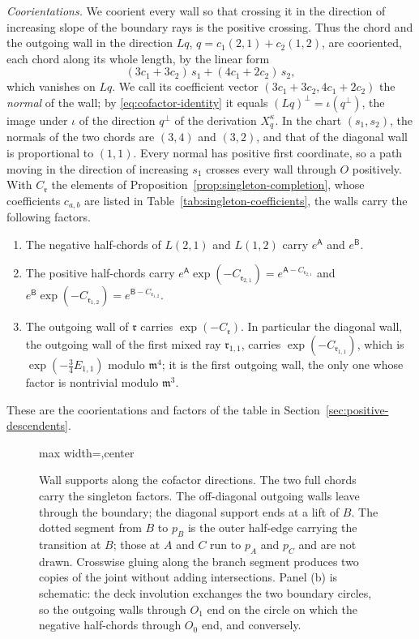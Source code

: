 \emph{Coorientations.}  We coorient every wall so that crossing it in the
direction of increasing slope of the boundary rays is the positive crossing.  Thus the
chord and the outgoing wall in the direction $Lq$,
$q=c_1(2,1)+c_2(1,2)$, are cooriented, each chord along its whole length,
by the linear form
\[
 (3c_1+3c_2)\,s_1+(4c_1+2c_2)\,s_2,
\]
which vanishes on $Lq$.  We call its coefficient vector
$(3c_1+3c_2,4c_1+2c_2)$ the \emph{normal} of the wall; by
\eqref{eq:cofactor-identity} it equals $(Lq)^\perp=\iota(q^\perp)$, the
image under $\iota$ of the direction $q^\perp$ of the derivation
$X^\kappa_q$.  In the chart $(s_1,s_2)$, the normals of the two chords are
$(3,4)$ and $(3,2)$, and that of the diagonal wall is proportional to
$(1,1)$.  Every normal has positive first coordinate, so a path moving in
the direction of increasing $s_1$ crosses every wall through $O$ positively.
With $C_{\mathfrak r}$ the elements of
Proposition~\ref{prop:singleton-completion}, whose coefficients $c_{a,b}$ are
listed in Table~\ref{tab:singleton-coefficients}, the walls carry the
following factors.
\begin{enumerate}
\item The negative half-chords of $L(2,1)$ and $L(1,2)$ carry $e^{\mathsf A}$
and $e^{\mathsf B}$.
\item The positive half-chords carry
$e^{\mathsf A}\exp(-C_{\mathfrak r_{2,1}})=e^{\mathsf A-C_{\mathfrak r_{2,1}}}$
and $e^{\mathsf B}\exp(-C_{\mathfrak r_{1,2}})=e^{\mathsf B-C_{\mathfrak r_{1,2}}}$.
\item The outgoing wall of $\mathfrak r$ carries $\exp(-C_{\mathfrak r})$.
In particular the diagonal wall, the outgoing wall of the first mixed ray
$\mathfrak r_{1,1}$, carries $\exp(-C_{\mathfrak r_{1,1}})$, which is
$\exp(-\frac34E_{1,1})$ modulo $\mathfrak m^4$; it is the first outgoing wall, the
only one whose factor is nontrivial modulo $\mathfrak m^3$.
\end{enumerate}
These are the coorientations and factors of the table in
Section~\ref{sec:positive-descendents}.

\begin{figure}[t]
\centering
\begin{adjustbox}{max width=\textwidth,center}

\end{adjustbox}
\caption{Wall supports along the cofactor directions.  The two full chords
carry the singleton factors.  The off-diagonal outgoing walls leave through
the boundary; the diagonal support ends at a lift of $B$.  The dotted
segment from $B$ to $p_B$ is the outer half-edge carrying the transition at $B$; those at $A$ and $C$ run to
$p_A$ and $p_C$ and are not drawn.  Crosswise gluing along the branch segment
produces two copies of the joint without adding intersections.  Panel (b) is
schematic: the deck involution exchanges the two boundary circles, so the
outgoing walls through $O_1$ end on the circle on which the negative
half-chords through $O_0$ end, and conversely.}
\label{fig:cofactor-supports}
\end{figure}

